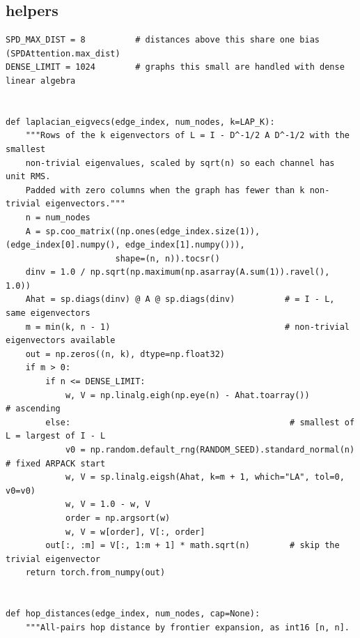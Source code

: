 
\subsection*{helpers}
\begin{lstlisting}[style=p1py]
SPD_MAX_DIST = 8          # distances above this share one bias (SPDAttention.max_dist)
DENSE_LIMIT = 1024        # graphs this small are handled with dense linear algebra


def laplacian_eigvecs(edge_index, num_nodes, k=LAP_K):
    """Rows of the k eigenvectors of L = I - D^-1/2 A D^-1/2 with the smallest
    non-trivial eigenvalues, scaled by sqrt(n) so each channel has unit RMS.
    Padded with zero columns when the graph has fewer than k non-trivial eigenvectors."""
    n = num_nodes
    A = sp.coo_matrix((np.ones(edge_index.size(1)), (edge_index[0].numpy(), edge_index[1].numpy())),
                      shape=(n, n)).tocsr()
    dinv = 1.0 / np.sqrt(np.maximum(np.asarray(A.sum(1)).ravel(), 1.0))
    Ahat = sp.diags(dinv) @ A @ sp.diags(dinv)          # = I - L, same eigenvectors
    m = min(k, n - 1)                                   # non-trivial eigenvectors available
    out = np.zeros((n, k), dtype=np.float32)
    if m > 0:
        if n <= DENSE_LIMIT:
            w, V = np.linalg.eigh(np.eye(n) - Ahat.toarray())           # ascending
        else:                                            # smallest of L = largest of I - L
            v0 = np.random.default_rng(RANDOM_SEED).standard_normal(n)   # fixed ARPACK start
            w, V = sp.linalg.eigsh(Ahat, k=m + 1, which="LA", tol=0, v0=v0)
            w, V = 1.0 - w, V
            order = np.argsort(w)
            w, V = w[order], V[:, order]
        out[:, :m] = V[:, 1:m + 1] * math.sqrt(n)        # skip the trivial eigenvector
    return torch.from_numpy(out)


def hop_distances(edge_index, num_nodes, cap=None):
    """All-pairs hop distance by frontier expansion, as int16 [n, n].


\end{lstlisting}
